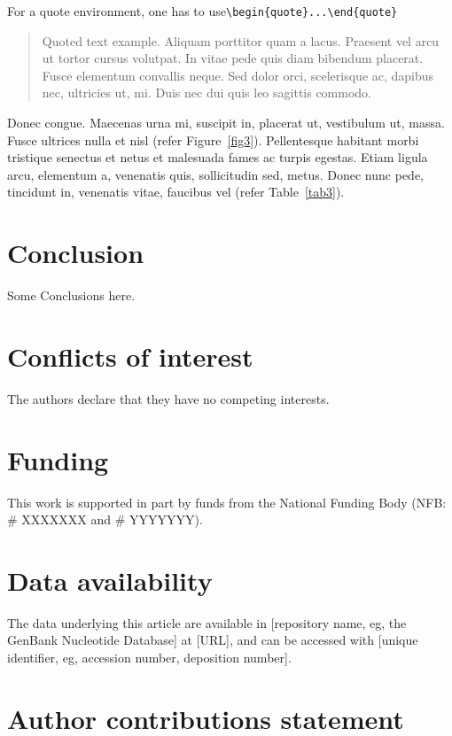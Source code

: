 \documentclass[unnumsec,webpdf,contemporary,large]{oup-authoring-template}%
\theoremstyle{thmstyleone}%
\theoremstyle{thmstyletwo}%
\theoremstyle{thmstylethree}%
\begin{document}
\noindent
For a quote environment, one has to use\newline \verb+\begin{quote}...\end{quote}+
\begin{quote}
Quoted text example. Aliquam porttitor quam a lacus. Praesent vel arcu ut tortor cursus volutpat. In vitae pede quis diam bibendum placerat. Fusce elementum
convallis neque. Sed dolor orci, scelerisque ac, dapibus nec, ultricies ut, mi. Duis nec dui quis leo sagittis commodo.
\end{quote}
Donec congue. Maecenas urna mi, suscipit in, placerat ut, vestibulum ut, massa. Fusce ultrices nulla et nisl (refer Figure~\ref{fig3}). Pellentesque habitant morbi tristique senectus et netus et malesuada fames ac turpis egestas. Etiam ligula arcu,
elementum a, venenatis quis, sollicitudin sed, metus. Donec nunc pede, tincidunt in, venenatis vitae, faucibus vel (refer Table~\ref{tab3}).

\section{Conclusion}

Some Conclusions here.

\section{Conflicts of interest}
The authors declare that they have no competing interests.

\section{Funding}
This work is supported in part by funds from the National Funding Body (NFB: \# XXXXXXX and \# YYYYYYY).

\section{Data availability}
The data underlying this article are available in [repository name, eg, the GenBank Nucleotide Database] at [URL], and can be accessed with [unique identifier, eg, accession number, deposition number].

\section{Author contributions statement}
\end{document}
